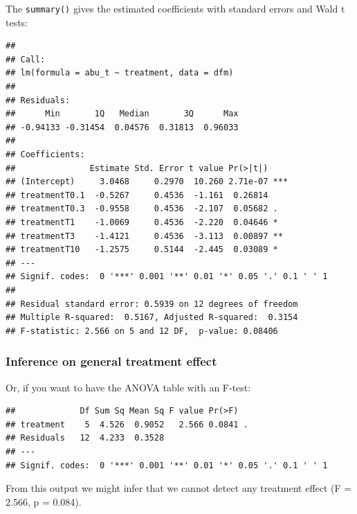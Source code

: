 The \texttt{summary()} gives the estimated coefficients with standard errors and Wald t tests:
\begin{knitrout}
\color{fgcolor}\small\begin{kframe}
\begin{alltt}
\end{alltt}
\begin{verbatim}
## 
## Call:
## lm(formula = abu_t ~ treatment, data = dfm)
## 
## Residuals:
##      Min       1Q   Median       3Q      Max 
## -0.94133 -0.31454  0.04576  0.31813  0.96033 
## 
## Coefficients:
##               Estimate Std. Error t value Pr(>|t|)    
## (Intercept)     3.0468     0.2970  10.260 2.71e-07 ***
## treatmentT0.1  -0.5267     0.4536  -1.161  0.26814    
## treatmentT0.3  -0.9558     0.4536  -2.107  0.05682 .  
## treatmentT1    -1.0069     0.4536  -2.220  0.04646 *  
## treatmentT3    -1.4121     0.4536  -3.113  0.00897 ** 
## treatmentT10   -1.2575     0.5144  -2.445  0.03089 *  
## ---
## Signif. codes:  0 '***' 0.001 '**' 0.01 '*' 0.05 '.' 0.1 ' ' 1
## 
## Residual standard error: 0.5939 on 12 degrees of freedom
## Multiple R-squared:  0.5167,	Adjusted R-squared:  0.3154 
## F-statistic: 2.566 on 5 and 12 DF,  p-value: 0.08406
\end{verbatim}
\end{kframe}
\end{knitrout}

\subsubsection{Inference on general treatment effect}
Or, if you want to have the ANOVA table with an F-test:
\begin{knitrout}
\color{fgcolor}\small\begin{kframe}
\begin{alltt}
\end{alltt}
\begin{verbatim}
##             Df Sum Sq Mean Sq F value Pr(>F)  
## treatment    5  4.526  0.9052   2.566 0.0841 .
## Residuals   12  4.233  0.3528                 
## ---
## Signif. codes:  0 '***' 0.001 '**' 0.01 '*' 0.05 '.' 0.1 ' ' 1
\end{verbatim}
\end{kframe}
\end{knitrout}

From this output we might infer that we cannot detect any treatment effect (F = 2.566, p = 0.084).

